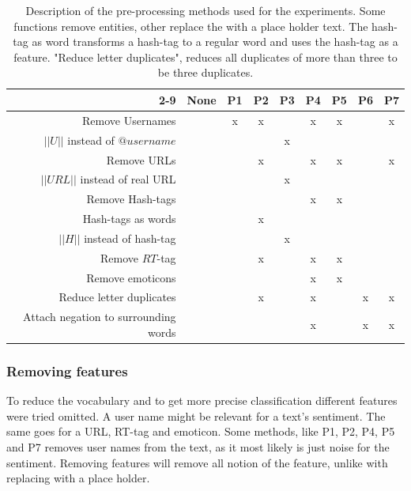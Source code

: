 \begin{table}[htb]
	\centering
	\begin{tabular}{|r||c|c|c|c|c|c|c|c|}

		\cline{2-9}
	 \multicolumn{1}{c| }{ } & \textbf{None} & \textbf{P1} & \textbf{P2} & \textbf{P3} & \textbf{P4} & \textbf{P5} & \textbf{P6} & \textbf{P7}  \\ \hline
		Remove Usernames                     & & x & x &   & x & x & & x \\ \hline
		$||U||$ instead of $@username$       & &   &   & x &   &   & & \\ \hline
		Remove URLs                          & &   & x &   & x & x & & x \\ \hline
		$||URL||$ instead of real URL        & &   &   & x &   &   & & \\ \hline
		Remove Hash-tags                     & &   &   &   & x & x & & \\ \hline
		Hash-tags as words                   & &   & x &   &   &   & & \\ \hline
		$||H||$ instead of hash-tag          & &   &   & x &   &   & & \\ \hline
		Remove $RT$-tag                      & &   & x &   & x & x & & \\ \hline
		Remove emoticons                     & &   &   &   & x & x & & \\ \hline
		Reduce letter duplicates             & &   & x &   & x &   & x & x \\ \hline
		Attach negation to surrounding words & &   &   &   & x &   & x & x \\ \hline
	\end{tabular}
	\caption[Description of used pre-processing methods]{Description of the pre-processing methods used for the experiments. Some functions remove entities, other replace the with a place holder text. The hash-tag as word transforms a hash-tag to a regular word and uses the hash-tag as a feature. "Reduce letter duplicates", reduces all duplicates of more than three to be three duplicates.}
	\label{tab:preproc_desc}
\end{table}

\subsubsection{Removing features}
To reduce the vocabulary and to get more precise classification different features were tried omitted. A user name might be relevant for a text's sentiment. The same goes for a URL, RT-tag and emoticon. Some methods, like P1, P2, P4, P5 and P7 removes user names from the text, as it most likely is just noise for the sentiment. Removing features will remove all notion of the feature, unlike with replacing with a place holder.

